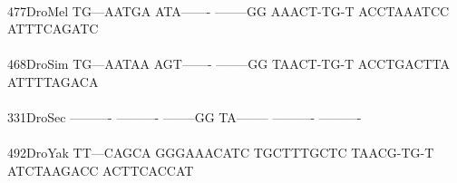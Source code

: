 \documentclass[11pt,twoside,reqno,a4paper]{article}
\begin{document}
{\\
477\hspace*{2\charwidth}DroMel	TG---AATGA	ATA-------	--------GG	AAACT-TG-T	ACCTAAATCC	ATTTCAGATC	\\
\hspace*{5\charwidth}\hspace*{7\charwidth}\hspace*{1\charwidth}\hspace*{1\charwidth}\hspace*{1\charwidth}\hspace*{1\charwidth}\hspace*{1\charwidth}\hspace*{1\charwidth}\\
468\hspace*{2\charwidth}DroSim	TG---AATAA	AGT-------	--------GG	TAACT-TG-T	ACCTGACTTA	ATTTTAGACA	\\
\hspace*{5\charwidth}\hspace*{7\charwidth}\hspace*{1\charwidth}\hspace*{1\charwidth}\hspace*{1\charwidth}\hspace*{1\charwidth}\hspace*{1\charwidth}\hspace*{1\charwidth}\\
331\hspace*{2\charwidth}DroSec	----------	----------	--------GG	TA--------	----------	----------	\\
\hspace*{5\charwidth}\hspace*{7\charwidth}\hspace*{1\charwidth}\hspace*{1\charwidth}\hspace*{1\charwidth}\hspace*{1\charwidth}\hspace*{1\charwidth}\hspace*{1\charwidth}\\
492\hspace*{2\charwidth}DroYak	TT---CAGCA	GGGAAACATC	TGCTTTGCTC	TAACG-TG-T	ATCTAAGACC	ACTTCACCAT	\\
\hspace*{5\charwidth}\hspace*{7\charwidth}\hspace*{1\charwidth}\hspace*{1\charwidth}\hspace*{1\charwidth}\hspace*{1\charwidth}\hspace*{1\charwidth}\hspace*{1\charwidth}\\
}
\end{document}
